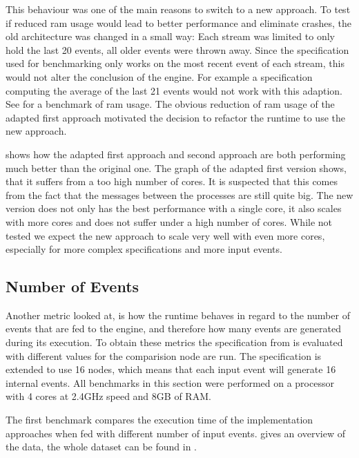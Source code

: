 This behaviour was one of the main reasons to switch to a new approach.
To test if reduced \gls{ram} usage would lead to better performance and eliminate crashes, the old architecture was changed in a small way: Each stream was limited to only hold the last 20 events, all older events were thrown away.
Since the specification used for benchmarking only works on the most recent event of each stream, this would not alter the conclusion of the engine.
For example a specification computing the average of the last 21 events would not work with this adaption.
See  for a benchmark of \gls{ram} usage.
The obvious reduction of \gls{ram} usage of the adapted first approach motivated the decision to refactor the runtime to use the new approach.

 shows how the adapted first approach and second approach are both performing much better than the original one.
The graph of the adapted first version shows, that it suffers from a too high number of cores.
It is suspected that this comes from the fact that the messages between the processes are still quite big.
The new version does not only has the best performance with a single core, it also scales with more cores and does not suffer under a high number of cores.
While not tested we expect the new approach to scale very well with even more cores, especially for more complex specifications and more input events.

\subsection{Number of Events}
\label{sec:evaluation:runtime_benchmarks:num_events}

Another metric looked at, is how the runtime behaves in regard to the number of events that are fed to the engine, and therefore how many events are generated during its execution.
To obtain these metrics the specification from  is evaluated with different values for the comparision node are run.
The specification is extended to use 16 nodes, which means that each input event will generate 16 internal events.
All benchmarks in this section were performed on a processor with 4 cores at 2.4GHz speed and 8GB of RAM.

The first benchmark compares the execution time of the implementation approaches when fed with different number of input events.
 gives an overview of the data, the whole dataset can be found in .

